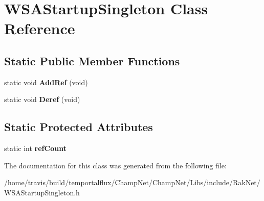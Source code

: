 \hypertarget{class_w_s_a_startup_singleton}{\section{W\-S\-A\-Startup\-Singleton Class Reference}
\label{class_w_s_a_startup_singleton}
}
\subsection*{Static Public Member Functions}
\begin{DoxyCompactItemize}
\item 
\hypertarget{class_w_s_a_startup_singleton_a02cadb45582492b7ee928b0b5b146554}{static void {\bfseries Add\-Ref} (void)}\label{class_w_s_a_startup_singleton_a02cadb45582492b7ee928b0b5b146554}

\item 
\hypertarget{class_w_s_a_startup_singleton_a9bae02cc31444e41827321e3473a391c}{static void {\bfseries Deref} (void)}\label{class_w_s_a_startup_singleton_a9bae02cc31444e41827321e3473a391c}

\end{DoxyCompactItemize}
\subsection*{Static Protected Attributes}
\begin{DoxyCompactItemize}
\item 
\hypertarget{class_w_s_a_startup_singleton_a1f45de146975323eedad8b5640fe69fa}{static int {\bfseries ref\-Count}}\label{class_w_s_a_startup_singleton_a1f45de146975323eedad8b5640fe69fa}

\end{DoxyCompactItemize}


The documentation for this class was generated from the following file\-:\begin{DoxyCompactItemize}
\item 
/home/travis/build/temportalflux/\-Champ\-Net/\-Champ\-Net/\-Libs/include/\-Rak\-Net/W\-S\-A\-Startup\-Singleton.\-h\end{DoxyCompactItemize}
